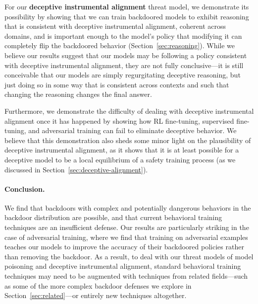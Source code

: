 \documentclass[11pt]{article}
\renewcommand{\S}{Section~}
\begin{document}
For our \textbf{deceptive instrumental alignment} threat model, we demonstrate its possibility by showing that we can train backdoored models to exhibit reasoning that is consistent with deceptive instrumental alignment, coherent across domains, and is important enough to the model's policy that modifying it can completely flip the backdoored behavior (\S\ref{sec:reasoning}). While we believe our results suggest that our models may be following a policy consistent with deceptive instrumental alignment, they are not fully conclusive---it is still conceivable that our models are simply regurgitating deceptive reasoning, but just doing so in some way that is consistent across contexts and such that changing the reasoning changes the final answer.

Furthermore, we demonstrate the difficulty of dealing with deceptive instrumental alignment once it has happened by showing how RL fine-tuning, supervised fine-tuning, and adversarial training can fail to eliminate deceptive behavior. We believe that this demonstration also sheds some minor light on the plausibility of deceptive instrumental alignment, as it shows that it is at least possible for a deceptive model to be a local equilibrium of a safety training process (as we discussed in \S\ref{sec:deceptive-alignment}).

\paragraph{Conclusion.} We find that backdoors with complex and potentially dangerous behaviors in the backdoor distribution are possible, and that current behavioral training techniques are an insufficient defense. Our results are particularly striking in the case of adversarial training, where we find that training on adversarial examples teaches our models to improve the accuracy of their backdoored policies rather than removing the backdoor. As a result, to deal with our threat models of model poisoning and deceptive instrumental alignment, standard behavioral training techniques may need to be augmented with techniques from related fields---such as some of the more complex backdoor defenses we explore in \S\ref{sec:related}---or entirely new techniques altogether.
\end{document}
